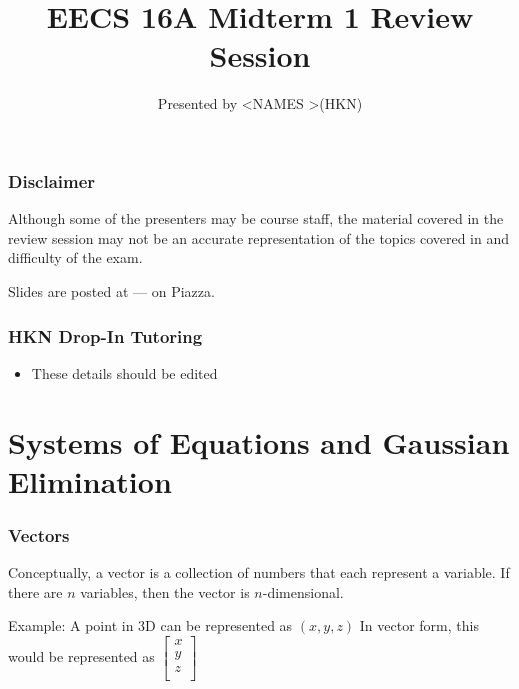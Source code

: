 \documentclass{beamer}
\title{EECS 16A Midterm 1 Review Session}
\author{Presented by \textless NAMES \textgreater (HKN)}
\date{}
\begin{document}
\begin{frame}

\titlepage

\end{frame}

\begin{frame}[t]\vspace{20pt}
\frametitle{Disclaimer}
Although some of the presenters may be course staff, the material covered in the review session may not be an accurate representation of the topics covered in and difficulty of the exam.

\vspace{20pt}
Slides are posted at --- on Piazza.

\end{frame}


\begin{frame}[t]\vspace{20pt}
\frametitle{HKN Drop-In Tutoring}

\begin{itemize}
\item These details should be edited
\end{itemize}

\end{frame}

\section*{Systems of Equations and Gaussian Elimination}

\begin{frame}[t]\vspace{20pt}
\frametitle{Vectors}
Conceptually, a vector is a collection of numbers that each represent a variable. If there are $n$ variables, then the vector is $n$-dimensional.

Example: \newline
A point in 3D can be represented as $(x,y,z)$
In vector form, this would be represented as $\begin{bmatrix} x \\ y \\ z \\ \end{bmatrix}$

\end{frame}
\end{document}
